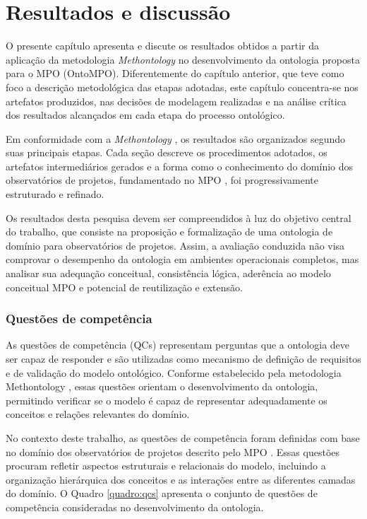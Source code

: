 \chapter{Resultados e discussão}

O presente capítulo apresenta e discute os resultados obtidos a partir da aplicação da metodologia \textit{Methontology} \cite{fernandez1997methontology} no desenvolvimento da ontologia proposta para o MPO \cite{vieira2022thesis} (OntoMPO). Diferentemente do capítulo anterior, que teve como foco a descrição metodológica das etapas adotadas, este capítulo concentra-se nos artefatos produzidos, nas decisões de modelagem realizadas e na análise crítica dos resultados alcançados em cada etapa do processo ontológico.

Em conformidade com a \textit{Methontology} \cite{fernandez1997methontology}, os resultados são organizados segundo suas principais etapas. Cada seção descreve os procedimentos adotados, os artefatos intermediários gerados e a forma como o conhecimento do domínio dos observatórios de projetos, fundamentado no MPO \cite{vieira2022thesis}, foi progressivamente estruturado e refinado.

Os resultados desta pesquisa devem ser compreendidos à luz do objetivo central do trabalho, que consiste na proposição e formalização de uma ontologia de domínio para observatórios de projetos. Assim, a avaliação conduzida não visa comprovar o desempenho da ontologia em ambientes operacionais completos, mas analisar sua adequação conceitual, consistência lógica, aderência ao modelo conceitual MPO \cite{vieira2022thesis} e potencial de reutilização e extensão.

\subsection{Questões de competência}

As questões de competência (QCs) representam perguntas que a ontologia deve ser capaz de responder e são utilizadas como mecanismo de definição de requisitos e de validação do modelo ontológico. Conforme estabelecido pela metodologia Methontology \cite{fernandez1997methontology}, essas questões orientam o desenvolvimento da ontologia, permitindo verificar se o modelo é capaz de representar adequadamente os conceitos e relações relevantes do domínio.

No contexto deste trabalho, as questões de competência foram definidas com base no domínio dos observatórios de projetos descrito pelo MPO \cite{vieira2022thesis}. Essas questões procuram refletir aspectos estruturais e relacionais do modelo, incluindo a organização hierárquica dos conceitos e as interações entre as diferentes camadas do domínio. O Quadro \ref{quadro:qcs} apresenta o conjunto de questões de competência consideradas no desenvolvimento da ontologia.

